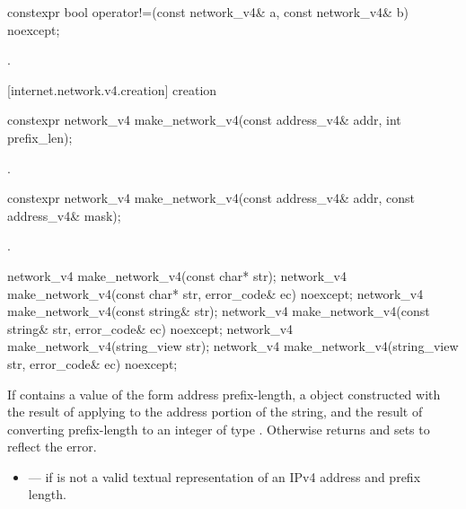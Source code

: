 \begin{itemdecl}
constexpr bool operator!=(const network_v4& a, const network_v4& b) noexcept;
\end{itemdecl}

\begin{itemdescr}
\pnum
\returns {}.
\end{itemdescr}



[internet.network.v4.creation]{ creation}

\begin{itemdecl}
constexpr network_v4 make_network_v4(const address_v4& addr, int prefix_len);
\end{itemdecl}

\begin{itemdescr}
\pnum
\returns {}.
\end{itemdescr}

\begin{itemdecl}
constexpr network_v4 make_network_v4(const address_v4& addr, const address_v4& mask);
\end{itemdecl}

\begin{itemdescr}
\pnum
\returns {}.
\end{itemdescr}

\begin{itemdecl}
network_v4 make_network_v4(const char* str);
network_v4 make_network_v4(const char* str, error_code& ec) noexcept;
network_v4 make_network_v4(const string& str);
network_v4 make_network_v4(const string& str, error_code& ec) noexcept;
network_v4 make_network_v4(string_view str);
network_v4 make_network_v4(string_view str, error_code& ec) noexcept;
\end{itemdecl}

\begin{itemdescr}
\pnum
\returns If  contains a value of the form address  prefix-length, a  object constructed with the result of applying  to the address portion of the string, and the result of converting prefix-length to an integer of type . Otherwise returns  and sets  to reflect the error.

\pnum
\errors
\begin{itemize}
\item
{} --- if  is not a valid textual representation of an IPv4 address and prefix length.
\end{itemize}
\end{itemdescr}



